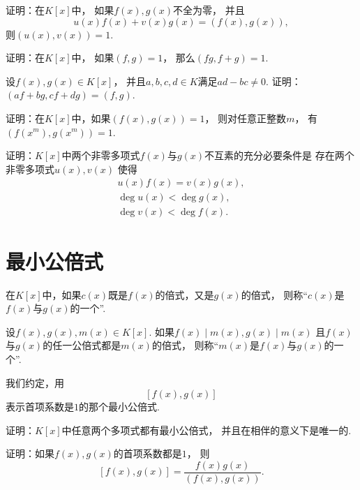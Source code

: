 \begin{example}
证明：在\(K[x]\)中，
如果\(f(x),g(x)\)不全为零，
并且\[
	u(x) f(x) + v(x) g(x) = (f(x),g(x)),
\]
则\((u(x),v(x))=1\).
\end{example}

\begin{example}
证明：在\(K[x]\)中，
如果\((f,g)=1\)，
那么\((fg,f+g)=1\).
\end{example}

\begin{example}
设\(f(x),g(x) \in K[x]\)，
并且\(a,b,c,d \in K\)满足\(ad-bc\neq0\).
证明：\((af+bg,cf+dg)=(f,g)\).
\end{example}

\begin{example}
证明：在\(K[x]\)中，如果\((f(x),g(x))=1\)，
则对任意正整数\(m\)，
有\((f(x^m),g(x^m))=1\).
\end{example}

\begin{example}
证明：\(K[x]\)中两个非零多项式\(f(x)\)与\(g(x)\)不互素的充分必要条件是
存在两个非零多项式\(u(x),v(x)\)
使得\begin{gather*}
	u(x) f(x) = v(x) g(x), \\
	\deg u(x) < \deg g(x), \\
	\deg v(x) < \deg f(x).
\end{gather*}
\end{example}

\section{最小公倍式}
在\(K[x]\)中，如果\(c(x)\)既是\(f(x)\)的倍式，又是\(g(x)\)的倍式，
则称“\(c(x)\)是\(f(x)\)与\(g(x)\)的一个”.

\begin{definition}
设\(f(x),g(x),m(x) \in K[x]\).
如果\(f(x) \mid m(x),
g(x) \mid m(x)\)
且\(f(x)\)与\(g(x)\)的任一公倍式都是\(m(x)\)的倍式，
则称“\(m(x)\)是\(f(x)\)与\(g(x)\)的一个”.
\end{definition}

我们约定，用\[
	[f(x), g(x)]
\]表示首项系数是\(1\)的那个最小公倍式.

\begin{example}
证明：\(K[x]\)中任意两个多项式都有最小公倍式，
并且在相伴的意义下是唯一的.
\end{example}

\begin{example}
证明：如果\(f(x),g(x)\)的首项系数都是\(1\)，
则\[
	[f(x),g(x)]
	= \frac{f(x) g(x)}{(f(x),g(x))}.
\]
\end{example}
